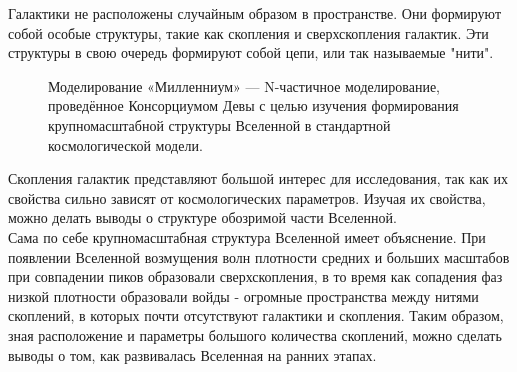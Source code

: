\Introduction

Галактики не расположены случайным образом в пространстве. Они формируют собой особые структуры, 
такие как скопления и сверхскопления галактик. Эти структуры в свою очередь формируют собой цепи, 
или так называемые "нити".\\

\begin{figure}
    \caption{Моделирование «Милленниум» — N-частичное моделирование, проведённое Консорциумом 
        Девы с целью изучения формирования крупномасштабной структуры Вселенной в стандартной
        космологической модели.}
\end{figure}

Скопления галактик представляют большой интерес для исследования, так как их свойства сильно зависят 
от космологических параметров. Изучая их свойства, можно делать выводы о структуре обозримой части 
Вселенной.\\

Сама по себе крупномасштабная структура Вселенной имеет объяснение. При появлении Вселенной 
возмущения волн плотности средних и больших масштабов при совпадении пиков образовали сверхскопления,
в то время как сопадения фаз низкой плотности образовали войды - огромные пространства между нитями 
скоплений, в которых почти отсутствуют галактики и скопления. Таким образом, зная расположение и 
параметры большого количества скоплений, можно сделать выводы о том, как развивалась Вселенная на 
ранних этапах.\\

